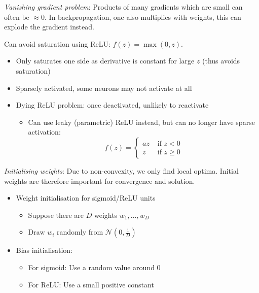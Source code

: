 \documentclass[11pt, %
	oneside, %
	english, %
	onehalfspacing, %
	parskip, %
	]{article} %
\theoremstyle{definition}
\begin{document}
\emph{Vanishing gradient problem}: Products of many gradients which are small can often be $\approx 0$. In backpropagation, one also multiplies with weights, this can explode the gradient instead.

Can avoid saturation using ReLU: $f(z)=\max (0, z)$.
\begin{itemize}
	\item Only saturates one side as derivative is constant for large $z$ (thus avoids saturation)
	\item Sparsely activated, some neurons may not activate at all
	\item Dying ReLU problem: once deactivated, unlikely to reactivate
	\begin{itemize}
		\item Can use leaky (parametric) ReLU instead, but can no longer have sparse activation:
		\begin{equation*}
			f(z)= \begin{cases}a z & \text { if } z<0 \\ z & \text { if } z \geq 0\end{cases}
		\end{equation*}
	\end{itemize}
\end{itemize}


\emph{Initialising weights}: Due to non-convexity, we only find local optima. Initial weights are therefore important for convergence and solution.

\begin{itemize}
	\item Weight initialisation for sigmoid/ReLU units
	\begin{itemize}
		\item Suppose there are $D$ weights $w_1, \ldots, w_D$
		\item Draw $w_i$ randomly from $\mathcal{N}\left(0, \frac{1}{D}\right)$
	\end{itemize}
	\item Bias initialisation:
	\begin{itemize}
		\item For sigmoid: Use a random value around 0
		\item For ReLU: Use a small positive constant
	\end{itemize}
\end{itemize}
\end{document}
